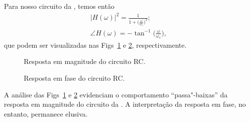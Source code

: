 Para nosso circuito da , temos então
\begin{gather}
	|H(\omega)|^2=\frac{1}{\displaystyle1+\Big(\frac{\omega}{\omega_c}\Big)^2};\\
	\angle H(\omega)=-\tan^{-1}\bigg(\frac{\omega}{\omega_c}\bigg),
\end{gather}
que podem ser visualizadas nas Figs~\ref{fig:rcPow} e \ref{fig:rcPha}, respectivamente.

\begin{figure}[ht]
	\centering
	\caption{Resposta em magnitude do circuito RC.}
	\label{fig:rcPow}
\end{figure}

\begin{figure}[ht]
	\centering
	\caption{Resposta em fase do circuito RC.}
	\label{fig:rcPha}
\end{figure}

A análise das Figs~\ref{fig:rcPow} e \ref{fig:rcPha} evidenciam o comportamento \enquote{passa"-baixas} da resposta em magnitude do circuito da . A interpretação da resposta em fase, no entanto, permanece elusiva.
